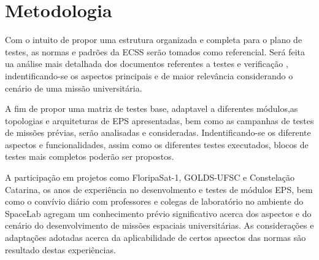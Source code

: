 \chapter{Metodologia}


Com o intuito de propor uma estrutura organizada e completa para o plano de testes, as normas e padrões da \gls{ECSS} serão tomados como referencial.
Será feita ua análise mais detalhada dos documentos referentes a testes \cite{ecss-e-st-10-03} e verificação \cite{ecss-e-st-10-02}, indentificando-se os aspectos principais e de maior relevância considerando o cenário de uma missão universitária.

A fim de propor uma matriz de testes base, adaptavel a diferentes módulos,as topologias e arquiteturas de \gls{EPS} apresentadas, bem como as campanhas de testes de missões prévias, serão analisadas e consideradas. Indentificando-se os diferente aspectos e funcionalidades, assim como os diferentes testes executados, blocos de testes mais completos poderão ser propostos.

A participação em projetos como FloripaSat-1, GOLDS-UFSC e Constelação Catarina, os anos de experiência no desenvolmento e testes de módulos \gls{EPS}, bem como o convívio diário com professores e colegas de laboratório no ambiente do SpaceLab agregam um conhecimento prévio significativo acerca dos aspectos e do cenário do desenvolvimento de missões espaciais universitárias.
As considerações e adaptações adotadas acerca da aplicabilidade de certos apsectos das normas são resultado destas experiências.